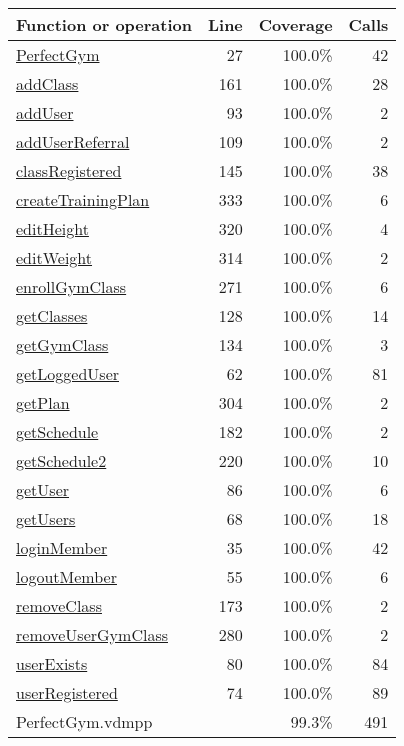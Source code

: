 \begin{longtable}{|l|r|r|r|}
\hline
Function or operation & Line & Coverage & Calls \\
\hline
\hline
\hyperref[PerfectGym:27]{PerfectGym} & 27&100.0\% & 42 \\
\hline
\hyperref[addClass:161]{addClass} & 161&100.0\% & 28 \\
\hline
\hyperref[addUser:93]{addUser} & 93&100.0\% & 2 \\
\hline
\hyperref[addUserReferral:109]{addUserReferral} & 109&100.0\% & 2 \\
\hline
\hyperref[classRegistered:145]{classRegistered} & 145&100.0\% & 38 \\
\hline
\hyperref[createTrainingPlan:333]{createTrainingPlan} & 333&100.0\% & 6 \\
\hline
\hyperref[editHeight:320]{editHeight} & 320&100.0\% & 4 \\
\hline
\hyperref[editWeight:314]{editWeight} & 314&100.0\% & 2 \\
\hline
\hyperref[enrollGymClass:271]{enrollGymClass} & 271&100.0\% & 6 \\
\hline
\hyperref[getClasses:128]{getClasses} & 128&100.0\% & 14 \\
\hline
\hyperref[getGymClass:134]{getGymClass} & 134&100.0\% & 3 \\
\hline
\hyperref[getLoggedUser:62]{getLoggedUser} & 62&100.0\% & 81 \\
\hline
\hyperref[getPlan:304]{getPlan} & 304&100.0\% & 2 \\
\hline
\hyperref[getSchedule:182]{getSchedule} & 182&100.0\% & 2 \\
\hline
\hyperref[getSchedule2:220]{getSchedule2} & 220&100.0\% & 10 \\
\hline
\hyperref[getUser:86]{getUser} & 86&100.0\% & 6 \\
\hline
\hyperref[getUsers:68]{getUsers} & 68&100.0\% & 18 \\
\hline
\hyperref[loginMember:35]{loginMember} & 35&100.0\% & 42 \\
\hline
\hyperref[logoutMember:55]{logoutMember} & 55&100.0\% & 6 \\
\hline
\hyperref[removeClass:173]{removeClass} & 173&100.0\% & 2 \\
\hline
\hyperref[removeUserGymClass:280]{removeUserGymClass} & 280&100.0\% & 2 \\
\hline
\hyperref[userExists:80]{userExists} & 80&100.0\% & 84 \\
\hline
\hyperref[userRegistered:74]{userRegistered} & 74&100.0\% & 89 \\
\hline
\hline
PerfectGym.vdmpp & & 99.3\% & 491 \\
\hline
\end{longtable}

